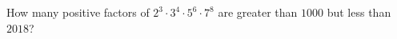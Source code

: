 How many positive factors of $2^3\cdot3^4\cdot5^6\cdot7^8$ are greater than $1000$ but less than $2018$?

